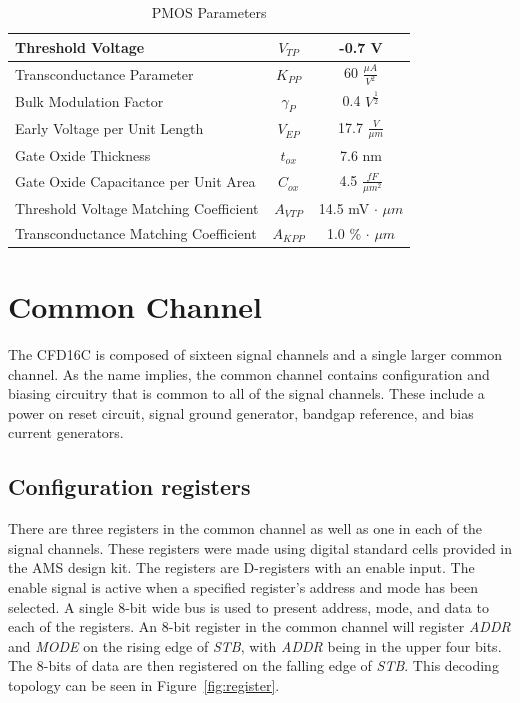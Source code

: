 \documentclass[12pt,oneside,final]{siuethesis}
\theoremstyle{definition}
\begin{document}
\begin{table} [htbp!]
\begin{center}
\begin{tabular}{| l | c | c |}
\hline 
Threshold Voltage & $V_{TP}$ & -0.7 V \\ 
\hline 
Transconductance Parameter & $K_{PP}$  &  60 $\frac{\mu A}{V^2}$ \\ 
\hline 
Bulk Modulation Factor & $\gamma_{P}$  &  0.4 $V^{\frac{1}{2}}$ \\ 
\hline 
Early Voltage per Unit Length & $V_{EP}$  &  17.7 $\frac{V}{\mu m}$ \\ 
\hline 
Gate Oxide Thickness & $t_{ox}$  &  7.6 nm \\ 
\hline 
Gate Oxide Capacitance per Unit Area & $C_{ox}$  &  4.5 $\frac{fF}{\mu m^2}$ \\ 
\hline 
Threshold Voltage Matching Coefficient & $A_{VTP}$  &  14.5 mV $\cdot$ $\mu m$ \\ 
\hline 
Transconductance Matching Coefficient & $A_{KPP}$  &  1.0 \% $\cdot$ $\mu m$ \\ 
\hline 
\end{tabular} 
\end{center}
\caption{PMOS Parameters}
\label{TBL:PMOS_PARMS}
\end{table}


\section{Common Channel}
\par The CFD16C is composed of sixteen signal channels and a single larger common channel. As the name implies, the common channel contains configuration and biasing circuitry that is common to all of the signal channels. These include a power on reset circuit, signal ground generator, bandgap reference, and bias current generators.

\subsection{Configuration registers}
\par There are three registers in the common channel as well as one in each of the signal channels. These registers were made using digital standard cells provided in the AMS design kit. The registers are D-registers with an enable input. The enable signal is active when a specified register's address and mode has been selected. A single 8-bit wide bus is used to present address, mode, and data to each of the registers. An 8-bit register in the common channel will register \emph{ADDR} and \emph{MODE} on the rising edge of \emph{STB}, with \emph{ADDR} being in the upper four bits. The 8-bits of data are then registered on the falling edge of \emph{STB}. This decoding topology can be seen in Figure~\ref{fig:register}.
\end{document}

